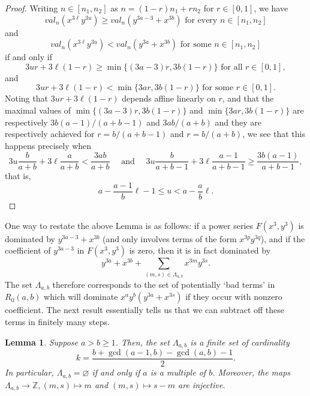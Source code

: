 \documentclass{article}
\newcommand{\ZZ}{\mathbb{Z}}
\newtheorem{lemma}{Lemma}
\begin{document}
\begin{proof}
    Writing $n\in[n_1,n_2]$ as $n=(1-r)n_1+rn_2$ for $r\in[0,1]$, we have 
    \[
        val_n(x^{3\ell}y^{3u}) \geq val_n(y^{3a-3}+ x^{3b}) \textrm{ for every } n\in\left[n_1,n_2\right]
    \]
        and
    \[
         val_n(x^{3\ell}y^{3u}) < val_n(y^{3a} + x^{3b}) \textrm{ for some } n\in\left[n_1,n_2\right]
    \]
    if and only if
    \[
    3ur+3\ell(1-r)\ge\min\{(3a-3)r,3b(1-r)\} \textrm{ for all } r\in[0,1],
    \]
    and 
    \[
    3ur+3\ell(1-r)<\min\{3ar,3b(1-r)\} \textrm { for some } r\in[0,1].
    \]
    Noting that $3ur+3\ell(1-r)$ depends affine linearly on $r$, and that the maximal values of $\min\{(3a-3)r,3b(1-r)\}$ and $\min\{3ar,3b(1-r)\}$ are respectively $3b(a-1)/(a+b-1)$ and $3ab/(a+b)$ and they are respectively achieved for $r=b/(a+b-1)$ and $r=b/(a+b)$, we see that this happens precisely when 
    \[
    3u\frac{b}{a+b}+3\ell\frac{a}{a+b}<\frac{3ab}{a+b} \quad \textrm{ and } \quad 3u\frac{b}{a+b-1}+3\ell\frac{a-1}{a+b-1}\geq \frac{3b(a-1)}{a+b-1},
    \]
    that is,
    \[
    a-\frac{a-1}{b}\ell - 1\leq u < a-\frac{a}{b}\ell.
    \]
    
\end{proof}
One way to restate the above Lemma is as follows: if a power series $F(x^3,y^3)$ is dominated by $y^{3a-3}+x^{3b}$ (and only involves terms of the form $x^{3p}y^{3q}$), and if the coefficient of $y^{3a-3}$ in $F(x^3,y^3)$ is zero, then it is in fact dominated by 
\[
y^{3a}+x^{3b}+\sum_{(m,s)\in\Lambda_{a,b}} x^{3m}y^{3s}.
\]
The set $\Lambda_{a,b}$ therefore corresponds to the set of potentially `bad terms' in $R_0(a,b)$ which will dominate $x^ay^b(y^{3a}+x^{3s})$ if they occur with nonzero coefficient. The next result essentially tells us that we can subtract off these terms in finitely many steps.
\begin{lemma}
    Suppose $a>b\geq1$. Then, the set $\Lambda_{a,b}$ is a finite set of cardinality
    \[
    k=\frac{b+\gcd(a-1,b)-\gcd(a,b)-1}{2}.
    \]
    In particular, $\Lambda_{a,b}=\varnothing$ if and only if $a$ is a multiple of $b$. Moreover, the maps $\Lambda_{a,b}\to \ZZ, (m,s)\mapsto m$ and $(m,s)\mapsto s-m$ are injective.
\end{lemma}
\end{document}
